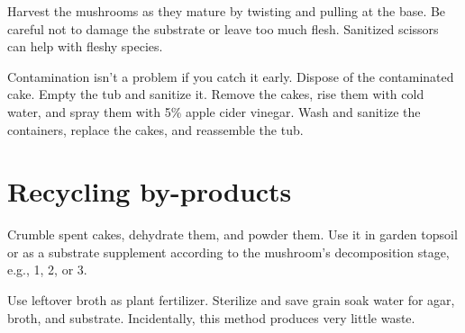 \documentclass{article}
\begin{document}
Harvest the mushrooms as they mature by twisting and pulling at the base.
Be careful not to damage the substrate or leave too much flesh.
Sanitized scissors can help with fleshy species.

Contamination isn't a problem if you catch it early.
Dispose of the contaminated cake.
Empty the tub and sanitize it.
Remove the cakes, rise them with cold water, and spray them with 5\% apple cider vinegar.
Wash and sanitize the containers, replace the cakes, and reassemble the tub.


\section*{Recycling by-products}

Crumble spent cakes, dehydrate them, and powder them.
Use it in garden topsoil or as a substrate supplement according to the mushroom's decomposition stage, e.g., 1\textdegree , 2\textdegree , or 3\textdegree .

Use leftover broth as plant fertilizer.
Sterilize and save grain soak water for agar, broth, and substrate.
Incidentally, this method produces very little waste. 
\end{document}

